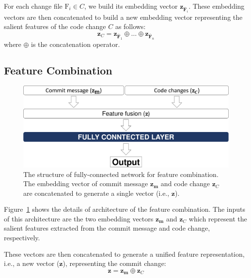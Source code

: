 For each change file $\text{F}_i \in C$, we build its embedding vector $\textbf{z}_{\overline{\textbf{F}}_{i}}$. These embedding vectors are then concatenated to build a new embedding vector representing the salient features of the code change $C$ as follows: 
\begin{equation}
\label{eq:concatenate_code}
\textbf{z}_C = \textbf{z}_{\overline{\textbf{F}}_{1}} \oplus \dots \oplus \textbf{z}_{\overline{\textbf{F}}_{n}}
\end{equation}
where $\oplus$ is the concatenation operator. 


\subsection{Feature Combination}
\label{sec:ftr_combine}
\begin{figure}
	\center
	\includegraphics[scale=0.15]{figs/code_msg.pdf}
	\caption{The structure of fully-connected network for feature combination. The embedding vector of commit message $\textbf{z}_\textbf{m}$ and code change $\textbf{z}_C$ are concatenated to generate a single vector (i.e., $\textbf{z}$).}
	\label{fig:code_msg}
\end{figure}

Figure~\ref{fig:code_msg} shows the details of architecture of the feature combination. The inputs of this architecture are the two embedding vectors $\textbf{z}_\textbf{m}$ and $\textbf{z}_C$ which represent the salient features extracted from the commit message and code change, respectively. 

These vectors are then concatenated to generate a unified feature representation, i.e., a new vector ($\textbf{z}$), representing the commit change:
\begin{equation}
\label{eq:commit_code}
\textbf{z} = \textbf{z}_\textbf{m} \oplus \textbf{z}_C
\end{equation}

